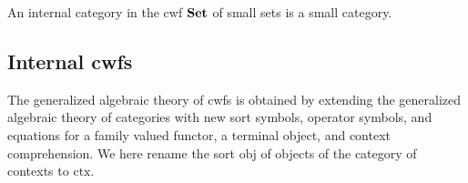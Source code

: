 \documentclass{lmcs}
\newcommand{\FYI}[1]{{\color{red}#1}}
\def\Obj{\mathrm{obj}}
\def\Hom{\mathrm{hom}}
\def\id{\mathrm{id}}
\newcommand{\ctx}{\mathrm{ctx}}
\begin{document}
An internal category in the cwf ${\bf Set}$ of small sets is a small category.


\subsection{Internal cwfs}\label{gat-cwf}

The generalized algebraic theory of cwfs is obtained by extending the generalized algebraic theory of categories with new sort symbols, operator symbols, and equations for a family valued functor, a terminal object, and context comprehension. We here rename the sort $\Obj$ of objects of the category of contexts to $\ctx$.
\end{document}
